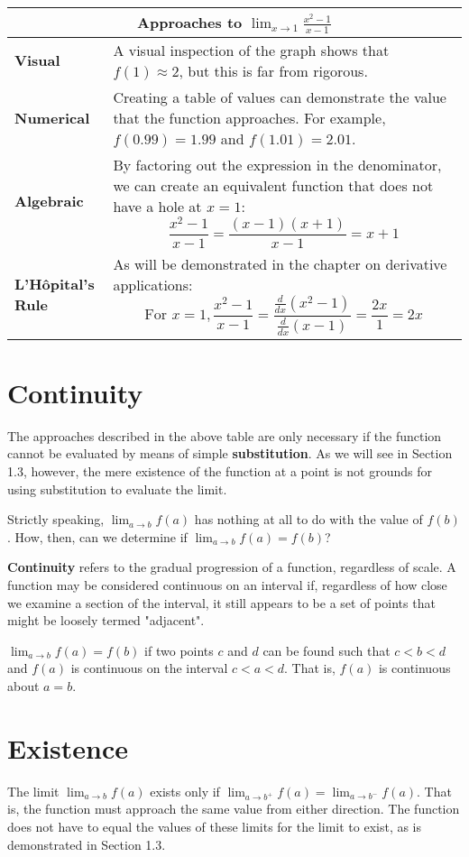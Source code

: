 \documentclass[10pt,a4paper]{book}
\begin{document}
\begin{tabularx}{\textwidth}{ l|X }
	\multicolumn{2}{c}{\textbf{Approaches to $\displaystyle \lim_{x \to 1} {\frac{x^2-1}{x-1}}$}} \\
	\hline
	\textbf{Visual} & A visual inspection of the graph shows that $f(1)\approx 2$, but this is far from rigorous. \\
	\textbf{Numerical} & Creating a table of values can demonstrate the value that the function approaches. For example, $f(0.99)=1.99$ and $f(1.01)=2.01$.\\
	\textbf{Algebraic} & By factoring out the expression in the denominator, we can create an equivalent function that does not have a hole at $x=1$:
	\[
	{\frac{x^2-1}{x-1}} = {\frac{(x-1)(x+1)}{x-1}} = x+1
	\]
	\\
	\textbf{L'H\^{o}pital's Rule} & As will be demonstrated in the chapter on derivative applications:
	\[
	\text{For }x=1, {\frac{x^2-1}{x-1}} = {\frac{\frac{d}{dx}\left(x^2-1\right)}{\frac{d}{dx}\left(x-1\right)}} = \frac{2x}{1} = 2x
	\]
	\\
\end{tabularx}

\section{Continuity}
The approaches described in the above table are only necessary if the function cannot be evaluated by means of simple \textbf{substitution}. As we will see in Section 1.3, however, the mere existence of the function at a point is not grounds for using substitution to evaluate the limit.

Strictly speaking, $\displaystyle \lim_{a \to b} f(a)$ has nothing at all to do with the value of $f(b)$. How, then, can we determine if $\displaystyle {\lim_{a \to b} f(a)} = f(b)$?

\textbf{Continuity} refers to the gradual progression of a function, regardless of scale. A function may be considered continuous on an interval if, regardless of how close we examine a section of the interval, it still appears to be a set of points that might be loosely termed "adjacent".

$\displaystyle {\lim_{a \to b} f(a)} = f(b)$ if two points $c$ and $d$ can be found such that $c < b < d$ and $f(a)$ is continuous on the interval $c < a < d$. That is, $f(a)$ is continuous about $a=b$.

\section{Existence}
The limit $\displaystyle \lim_{a \to b} f(a)$ exists only if $\displaystyle \lim_{a \to b^{+}} f(a) = \lim_{a \to b^{-}} f(a)$. That is, the function must approach the same value from either direction. The function does not have to equal the values of these limits for the limit to exist, as is demonstrated in Section 1.3.
\end{document}
